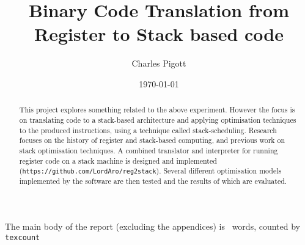 \documentclass[11pt,a4paper,notitlepage]{report}
\title{Binary Code Translation from Register to Stack based code}
\author{Charles Pigott}
\date{\today}
\newcommand\wordcount{\unskip}
\begin{document}
\maketitle

\begin{abstract}
This project explores something related to the above experiment. However the
focus is on translating code to a stack-based architecture and applying
optimisation techniques to the produced instructions, using a technique called
stack-scheduling. Research focuses on the history of register and stack-based
computing, and previous work on stack optimisation techniques. A combined
translator and interpreter for running register code on a stack machine is
designed and implemented (\texttt{https://github.com/LordAro/reg2stack}).
Several different optimisation models implemented by the software are then
tested and the results of which are evaluated.
\end{abstract}

\vfill

\small{The main body of the report (excluding the appendices) is
\wordcount~words, counted by \texttt{texcount}}

\cleardoublepage%

\normalsize
\tableofcontents








\small\printbibliography%
\clearpage

\begin{appendices}

\end{appendices}
\end{document}
